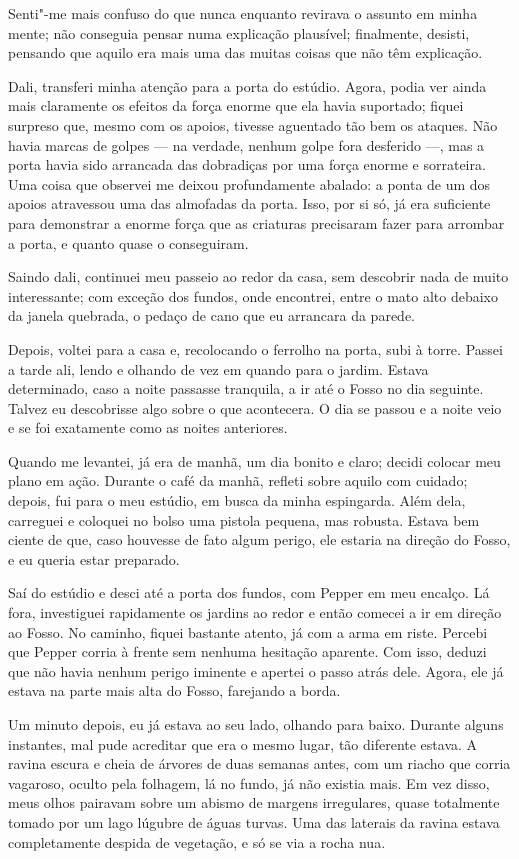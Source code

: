 Senti"-me mais confuso do que nunca enquanto revirava o assunto em minha mente; não conseguia pensar numa explicação
plausível; finalmente, desisti, pensando que aquilo era mais uma das muitas coisas que não têm explicação.

Dali, transferi minha atenção para a porta do estúdio. Agora, podia ver ainda mais claramente os efeitos da força
enorme que ela havia suportado; fiquei surpreso que, mesmo com os apoios, tivesse aguentado tão bem os ataques. Não
havia marcas de golpes --- na verdade, nenhum golpe fora desferido ---, mas a porta havia sido arrancada das dobradiças por
uma força enorme e sorrateira. Uma coisa que observei me deixou profundamente abalado: a ponta de um dos apoios
atravessou uma das almofadas da porta. Isso, por si só, já era suficiente para demonstrar a enorme força que as
criaturas precisaram fazer para arrombar a porta, e quanto quase o conseguiram.

Saindo dali, continuei meu passeio ao redor da casa, sem descobrir nada de muito interessante; com exceção dos fundos,
onde encontrei, entre o mato alto debaixo da janela quebrada, o pedaço de cano que eu arrancara da parede.

Depois, voltei para a casa e, recolocando o ferrolho na porta, subi à torre. Passei a tarde ali, lendo e olhando de vez
em quando para o jardim. Estava determinado, caso a noite passasse tranquila, a ir até o Fosso no dia seguinte.
Talvez eu descobrisse algo sobre o que acontecera. O dia se passou e a noite veio e se foi exatamente como as noites
anteriores.

Quando me levantei, já era de manhã, um dia bonito e claro; decidi colocar meu plano em ação. Durante o café da manhã,
refleti sobre aquilo com cuidado; depois, fui para o meu estúdio, em busca da minha espingarda. Além dela, carreguei e
coloquei no bolso uma pistola pequena, mas robusta. Estava bem ciente de que, caso houvesse de fato algum perigo, ele
estaria na direção do Fosso, e eu queria estar preparado.

Saí do estúdio e desci até a porta dos fundos, com Pepper em meu encalço. Lá fora, investiguei rapidamente os jardins
ao redor e então comecei a ir em direção ao Fosso. No caminho, fiquei bastante atento, já com a arma em riste. Percebi
que Pepper corria à frente sem nenhuma hesitação aparente. Com isso, deduzi que não havia nenhum perigo iminente e
apertei o passo atrás dele. Agora, ele já estava na parte mais alta do Fosso, farejando a borda. 

Um minuto depois, eu já estava ao seu lado, olhando para baixo. Durante alguns instantes, mal pude acreditar que era o
mesmo lugar, tão diferente estava. A ravina escura e cheia de árvores de duas semanas antes, com um riacho que corria
vagaroso, oculto pela folhagem, lá no fundo, já não existia mais. Em vez disso, meus olhos pairavam sobre um abismo de
margens irregulares, quase totalmente tomado por um lago lúgubre de águas turvas. Uma das laterais da ravina estava
completamente despida de vegetação, e só se via a rocha nua.

